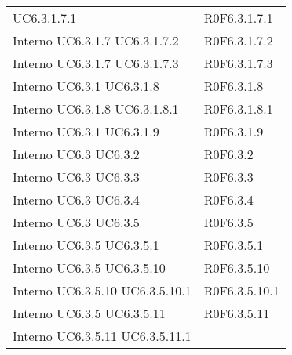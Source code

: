 \begin{longtable}{p{2.5cm}!{\VRule[1pt]}p{2.5cm}}
 \newline UC6.3.1.7.1
 & R0F6.3.1.7.1 \\
Interno \newline UC6.3.1.7
 \newline UC6.3.1.7.2
 & R0F6.3.1.7.2 \\
Interno \newline UC6.3.1.7
 \newline UC6.3.1.7.3
 & R0F6.3.1.7.3 \\
Interno \newline UC6.3.1
 \newline UC6.3.1.8
 & R0F6.3.1.8 \\
Interno \newline UC6.3.1.8
 \newline UC6.3.1.8.1
 & R0F6.3.1.8.1 \\
Interno \newline UC6.3.1
 \newline UC6.3.1.9
 & R0F6.3.1.9 \\
Interno \newline UC6.3
 \newline UC6.3.2
 & R0F6.3.2 \\
Interno \newline UC6.3
 \newline UC6.3.3
 & R0F6.3.3 \\
Interno \newline UC6.3
 \newline UC6.3.4
 & R0F6.3.4 \\
Interno \newline UC6.3
 \newline UC6.3.5
 & R0F6.3.5 \\
Interno \newline UC6.3.5
 \newline UC6.3.5.1
 & R0F6.3.5.1 \\
Interno \newline UC6.3.5
 \newline UC6.3.5.10
 & R0F6.3.5.10 \\
Interno \newline UC6.3.5.10
 \newline UC6.3.5.10.1
 & R0F6.3.5.10.1 \\
Interno \newline UC6.3.5
 \newline UC6.3.5.11
 & R0F6.3.5.11 \\
Interno \newline UC6.3.5.11
 \newline UC6.3.5.11.1

\end{longtable}
